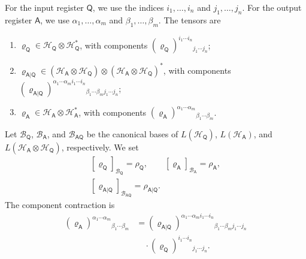 \documentclass[
    aps,
    pra,
    reprint,
    superscriptaddress,
    nofootinbib
]{revtex4-2}
\theoremstyle{definition}
\theoremstyle{plain}
\begin{document}
For the input register $\mathsf{Q}$, we use the indices
$i_{1},\dots,i_{n}$ and $j_{1},\dots,j_{n}$. For the output register
$\mathsf{A}$, we use $\alpha_{1},\dots,\alpha_{m}$ and
$\beta_{1},\dots,\beta_{m}$. The tensors are
\begin{enumerate}
    \item
    $\varrho_{\mathsf{Q}}
    \in
    \mathcal{H}_{\mathsf{Q}}
    \otimes
    \mathcal{H}_{\mathsf{Q}}^{*}$, with components
    $(\varrho_{\mathsf{Q}})
    ^{i_{1}\cdots i_{n}}{}_{j_{1}\cdots j_{n}}$;

    \item
    $\varrho_{\mathsf{A}|\mathsf{Q}}
    \in
    (\mathcal{H}_{\mathsf{A}}\otimes\mathcal{H}_{\mathsf{Q}})
    \otimes
    (\mathcal{H}_{\mathsf{A}}\otimes\mathcal{H}_{\mathsf{Q}})^{*}$,
    with components
    $(\varrho_{\mathsf{A}|\mathsf{Q}})
    ^{\alpha_{1}\cdots\alpha_{m}i_{1}\cdots i_{n}}
    {}_{\beta_{1}\cdots\beta_{m}j_{1}\cdots j_{n}}$;

    \item
    $\varrho_{\mathsf{A}}
    \in
    \mathcal{H}_{\mathsf{A}}
    \otimes
    \mathcal{H}_{\mathsf{A}}^{*}$, with components
    $(\varrho_{\mathsf{A}})
    ^{\alpha_{1}\cdots\alpha_{m}}
    {}_{\beta_{1}\cdots\beta_{m}}$.
\end{enumerate}
Let $\mathcal{B}_{\mathsf{Q}}$, $\mathcal{B}_{\mathsf{A}}$, and
$\mathcal{B}_{\mathsf{A}\mathsf{Q}}$ be the canonical bases of
$L(\mathcal{H}_{\mathsf{Q}})$,
$L(\mathcal{H}_{\mathsf{A}})$, and
$L(\mathcal{H}_{\mathsf{A}}\otimes\mathcal{H}_{\mathsf{Q}})$,
respectively. We set
\begin{equation}
    \begin{gathered}
    [\varrho_{\mathsf{Q}}]_{\mathcal{B}_{\mathsf{Q}}}
    =
    \rho_{\mathsf{Q}},
    \qquad
    [\varrho_{\mathsf{A}}]_{\mathcal{B}_{\mathsf{A}}}
    =
    \rho_{\mathsf{A}},\\
    [\varrho_{\mathsf{A}|\mathsf{Q}}]
    _{\mathcal{B}_{\mathsf{A}\mathsf{Q}}}
    =
    \rho_{\mathsf{A}|\mathsf{Q}}.
    \end{gathered}
\end{equation}
The component contraction is
\begin{equation}
    \begin{aligned}
    (\varrho_{\mathsf{A}})
    ^{\alpha_{1}\cdots\alpha_{m}}
    {}_{\beta_{1}\cdots\beta_{m}}
    &=
    (\varrho_{\mathsf{A}|\mathsf{Q}})
    ^{\alpha_{1}\cdots\alpha_{m}i_{1}\cdots i_{n}}
    {}_{\beta_{1}\cdots\beta_{m}j_{1}\cdots j_{n}}\\[-0.25em]
    &\quad\cdot
    (\varrho_{\mathsf{Q}})
    ^{i_{1}\cdots i_{n}}{}_{j_{1}\cdots j_{n}}.
    \end{aligned}
\end{equation}
\end{document}
